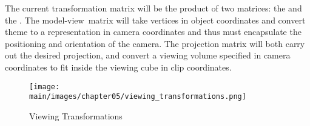 \documentclass[../COS3712_Notes.tex]{subfiles}
\begin{document}
      The current transformation matrix will be the product of two matrices:
      the  and the .
      The model-view~matrix will take vertices in object coordinates and convert theme
      to a representation in camera coordinates and thus must encapsulate the positioning
      and orientation of the camera.
      The projection matrix will both carry out the desired projection,
      and convert a viewing volume specified in camera coordinates to fit inside the viewing
      cube in clip coordinates.

      \begin{figure}
        \begin{center}
          \texttt{[image: \\main/images/chapter05/viewing\_transformations.png]}
        \end{center}
        \caption{Viewing Transformations}
      \end{figure}
\end{document}
